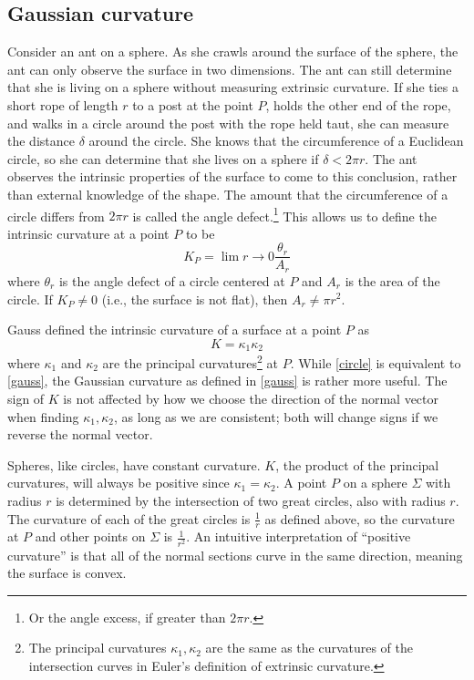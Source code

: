 \documentclass[letterpaper,titlepage]{article}
\begin{document}
\subsection{Gaussian curvature}
Consider an ant on a sphere.
As she crawls around the surface of the sphere, the ant can only observe the surface in two dimensions.
The ant can still determine that she is living on a sphere without measuring extrinsic curvature.
If she ties a short rope of length $r$ to a post at the point $P$, holds the other end of the rope, and walks in a circle around the post with the rope held taut, she can measure the distance $\delta$ around the circle.
She knows that the circumference of a Euclidean circle, so she can determine that she lives on a sphere if $\delta < 2\pi r$.\cite{adventures}
The ant observes the intrinsic properties of the surface to come to this conclusion, rather than external knowledge of the shape.
The amount that the circumference of a circle differs from $2\pi r$ is called the angle defect.\footnote{Or the angle excess, if greater than $2\pi r$.}
This allows us to define the intrinsic curvature at a point $P$ to be
\begin{equation}
K_P = \lim{r \to 0} \frac{\theta_r}{A_r}
\label{circle}
\end{equation}
where $\theta_r$ is the angle defect of a circle centered at $P$ and $A_r$ is the area of the circle.
If $K_P \not= 0$ (i.e., the surface is not flat), then $A_r \not= \pi r^2$.\cite{makingmath}

Gauss defined the intrinsic curvature of a surface at a point $P$ as
\begin{equation}
K = \kappa_1\kappa_2
\label{gauss}
\end{equation}
where $\kappa_1$ and $\kappa_2$ are the principal curvatures\footnote{The principal curvatures $\kappa_1,\kappa_2$ are the same as the curvatures of the intersection curves in Euler's definition of extrinsic curvature.} at $P$.\cite{gauss}
While \eqref{circle} is equivalent to \eqref{gauss}, the Gaussian curvature as defined in \eqref{gauss} is rather more useful.
The sign of $K$ is not affected by how we choose the direction of the normal vector when finding $\kappa_1,\kappa_2$, as long as we are consistent; both will change signs if we reverse the normal vector.

Spheres, like circles, have constant curvature.
$K$, the product of the principal curvatures, will always be positive since $\kappa_1 = \kappa_2$.
A point $P$ on a sphere $\Sigma$ with radius $r$ is determined by the intersection of two great circles, also with radius $r$.
The curvature of each of the great circles is $\frac{1}{r}$ as defined above, so the curvature at $P$ and other points on $\Sigma$ is $\frac{1}{r^2}$.
An intuitive interpretation of ``positive curvature'' is that all of the normal sections curve in the same direction, meaning the surface is convex.\cite{singer}
\end{document}
